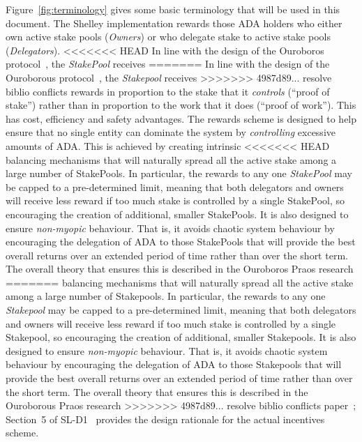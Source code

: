 \documentclass[11pt,a4paper,dvipsnames,twosided,final]{article}
\newcommand{\ada}{ADA{}}
\begin{document}
Figure~\ref{fig:terminology} gives some basic terminology that will be used in this document.
The Shelley implementation rewards those \ada{} holders who either own active stake pools
(\emph{Owners}) or who delegate stake to active stake pools (\emph{Delegators}).
<<<<<<< HEAD
In line with the design of the Ouroboros protocol~\cite{ouroboros_classic}, the \emph{StakePool} receives
=======
In line with the design of the Ouroborous protocol~\cite{ouroboros_classic}, the \emph{Stakepool} receives
>>>>>>> 4987d89... resolve biblio conflicts
rewards in proportion to the stake that it \emph{controls} (``proof of
stake'') rather than in proportion to the work that it does (``proof of work'').
This has cost, efficiency and safety advantages.
The rewards scheme is designed to help ensure that no single entity can
dominate the system by \emph{controlling} excessive amounts of \ada{}.  This is achieved by creating intrinsic
<<<<<<< HEAD
balancing mechanisms that will naturally spread all the active stake among a large number of StakePools.
In particular, the rewards to any one \emph{StakePool} may be capped to a pre-determined limit,
meaning that both delegators and owners will receive less reward if too much stake is controlled by a single StakePool,
so encouraging the creation of additional, smaller StakePools.
It is also designed to ensure \emph{non-myopic} behaviour.  That is, it avoids chaotic system behaviour by encouraging the delegation of \ada{} to those StakePools that will provide
the best overall returns over an extended period of time rather than over the short term.
The overall theory that ensures this is described in the Ouroboros Praos research
=======
balancing mechanisms that will naturally spread all the active stake among a large number of Stakepools.
In particular, the rewards to any one \emph{Stakepool} may be capped to a pre-determined limit,
meaning that both delegators and owners will receive less reward if too much stake is controlled by a single Stakepool,
so encouraging the creation of additional, smaller Stakepools.
It is also designed to ensure \emph{non-myopic} behaviour.  That is, it avoids chaotic system behaviour by encouraging the delegation of \ada{} to those Stakepools that will provide
the best overall returns over an extended period of time rather than over the short term.
The overall theory that ensures this is described in the Ouroborous Praos research
>>>>>>> 4987d89... resolve biblio conflicts
paper~\cite{ouroboros_praos}; Section~5 of SL-D1~\cite{delegation_design} provides the design rationale
for the actual incentives scheme.
\end{document}
